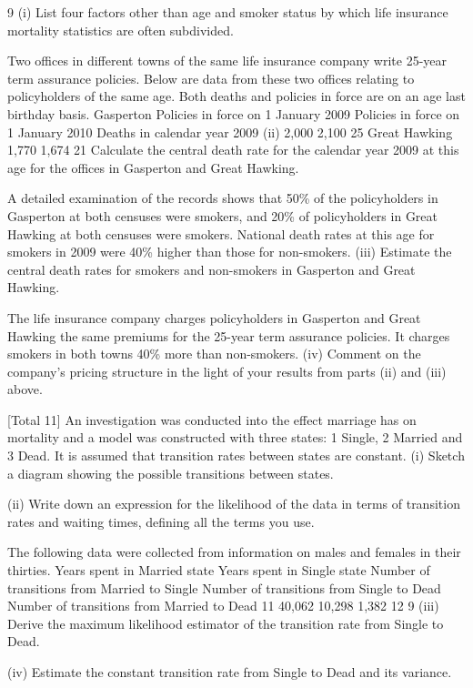 \documentclass[a4paper,12pt]{article}
\begin{document}
\begin{enumerate}
[Total 10]9
(i)
List four factors other than age and smoker status by which life insurance
mortality statistics are often subdivided.

Two offices in different towns of the same life insurance company write 25-year term
assurance policies. Below are data from these two offices relating to policyholders of
the same age. Both deaths and policies in force are on an age last birthday basis.
Gasperton
Policies in force on 1 January 2009
Policies in force on 1 January 2010
Deaths in calendar year 2009
(ii)
2,000
2,100
25
Great Hawking
1,770
1,674
21
Calculate the central death rate for the calendar year 2009 at this age for the
offices in Gasperton and Great Hawking.

A detailed examination of the records shows that 50\% of the policyholders in
Gasperton at both censuses were smokers, and 20\% of policyholders in Great
Hawking at both censuses were smokers. National death rates at this age for smokers
in 2009 were 40\% higher than those for non-smokers.
(iii)
Estimate the central death rates for smokers and non-smokers in Gasperton
and Great Hawking.

The life insurance company charges policyholders in Gasperton and Great Hawking
the same premiums for the 25-year term assurance policies. It charges smokers in
both towns 40\% more than non-smokers.
(iv)
Comment on the company’s pricing structure in the light of your results from
parts (ii) and (iii) above.

[Total 11]
An investigation was conducted into the effect marriage has on mortality and a model
was constructed with three states: 1 Single, 2 Married and 3 Dead. It is assumed that
transition rates between states are constant.
(i) Sketch a diagram showing the possible transitions between states.

(ii) Write down an expression for the likelihood of the data in terms of transition
rates and waiting times, defining all the terms you use.

The following data were collected from information on males and females in their
thirties.
Years spent in Married state
Years spent in Single state
Number of transitions from Married to Single
Number of transitions from Single to Dead
Number of transitions from Married to Dead
11
40,062
10,298
1,382
12
9
(iii) Derive the maximum likelihood estimator of the transition rate from Single to
Dead.

(iv) Estimate the constant transition rate from Single to Dead and its variance. 



\end{enumerate}
\end{document}
